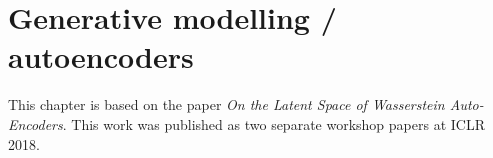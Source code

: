 \chapter{Generative modelling / autoencoders}

\ifpdf
    \graphicspath{{Chapter5/Figs/Raster/}{Chapter5/Figs/PDF/}{Chapter5/Figs/}}
\else
    \graphicspath{{Chapter5/Figs/Vector/}{Chapter5/Figs/}}
\fi

This chapter is based on the paper \emph{On the Latent Space of Wasserstein Auto-Encoders}. This work was published as two separate workshop papers at ICLR 2018.







%



